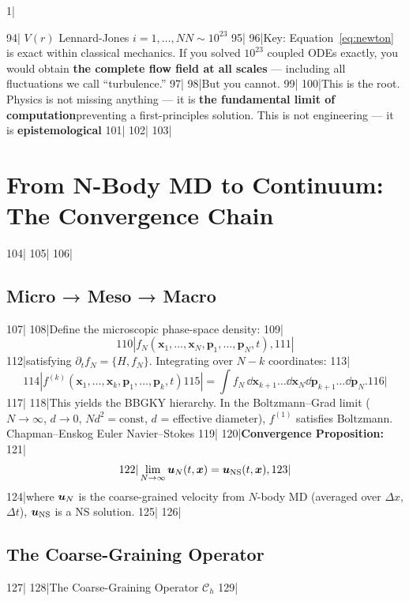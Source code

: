 1|\documentclass[11pt,a4paper]{article}
\begin{document}
94| $V(r)$  Lennard-Jones $i=1,\dots,N$$N\sim 10^{23}$
95|
96|Key: Equation~\eqref{eq:newton} is \textbf{}exact within classical mechanics. If you solved $10^{23}$ coupled ODEs exactly, you would obtain \textbf{the complete flow field at all scales} — including all fluctuations we call ``turbulence.''
97|
98|But you cannot.
99|
100|This is the root. Physics is not missing anything — it is \textbf{the fundamental limit of computation}preventing a first-principles solution. This is not engineering — it is \textbf{epistemological}
101|
102|%
103|\section{From N-Body MD to Continuum: The Convergence Chain}
104|%
105|
106|\subsection{Micro → Meso → Macro}
107|
108|Define the microscopic phase-space density:
109|\begin{equation}\label{eq:liouville}
110|  f_N(\bm{x}_1,\dots,\bm{x}_N,\bm{p}_1,\dots,\bm{p}_N,t),
111|\end{equation}
112|satisfying $\partial_t f_N = \{H, f_N\}$. Integrating over $N-k$ coordinates:
113|\begin{equation}\label{eq:bggky}
114|  f^{(k)}(\bm{x}_1,\dots,\bm{x}_k,\bm{p}_1,\dots,\bm{p}_k,t)
115|  = \int f_N \,\dd\bm{x}_{k+1}\dots\dd\bm{x}_N\dd\bm{p}_{k+1}\dots\dd\bm{p}_N.
116|\end{equation}
117|
118|This yields the BBGKY hierarchy. In the Boltzmann--Grad limit ($N\to\infty$, $d\to 0$, $Nd^2 = \text{const}$, $d$ = effective diameter), $f^{(1)}$ satisfies Boltzmann. Chapman--Enskog  Euler  Navier--Stokes 
119|
120|\textbf{Convergence Proposition:}
121|\begin{equation}\label{eq:convergence}
122|  \lim_{N\to\infty} \bm{u}_N(t,\bm{x}) = \bm{u}_{\text{NS}}(t,\bm{x}),
123|\end{equation}
124|where $\uN$ is the coarse-grained velocity from $N$-body MD (averaged over $\Delta x$, $\Delta t$), $\uNS$ is a NS solution.
125|
126|\subsection{The Coarse-Graining Operator}
127|
128|The Coarse-Graining Operator $\mathcal{C}_{h}$
129|\begin{equation}\label{eq:coarse}

\end{equation}$$
\end{document}
